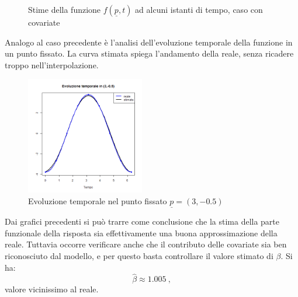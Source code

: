 \documentclass[a4paper,11pt,twoside,openright]{book}							%
\begin{document}
\begin{figure}[h]
{   }
\caption{Stime della funzione $f(\underline p,t)$ ad alcuni istanti di tempo, caso con covariate}
\label{fig:DomCcovar_ris}
\end{figure}

Analogo al caso precedente è l'analisi dell'evoluzione temporale della funzione in un punto fissato. La curva stimata spiega l'andamento della reale, senza ricadere troppo nell'interpolazione.
\begin{figure}[h]
\centering
\includegraphics[width=0.46\textwidth]{Immagini/DomCcovar_tfissato.png}   
\caption{Evoluzione temporale nel punto fissato $\underline p=(3,-0.5)$}
\label{fig:DomCcovar_ris2}
\end{figure}

Dai grafici precedenti si può trarre come conclusione che la stima della parte funzionale della risposta sia effettivamente una buona approssimazione della reale. Tuttavia occorre verificare anche che il contributo delle covariate sia ben riconosciuto dal modello, e per questo basta controllare il valore stimato di $\beta$. Si ha:
$$
\hat{\beta} \approx 1.005 \ ,
$$
valore vicinissimo al reale.
\end{document}
